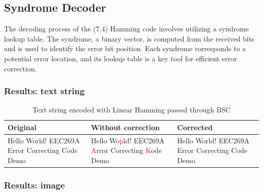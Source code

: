 \documentclass{article}
\begin{document}
\subsection{Syndrome Decoder}
The decoding process of the (7,4) Hamming code involves utilizing a syndrome lookup table. The syndrome, a binary vector, is computed from the received bits and is used to identify the error bit position. Each syndrome corresponds to a potential error location, and its lookup table is a key tool for efficient error correction.





\subsubsection{Results: text string}

\begin{table}[htb]
    \centering
    \caption{Text string encoded with Linear Hamming passed through BSC}
    \label{tab:text-linear-bsc}
    \renewcommand{\arraystretch}{1.5}
    \begin{tabulary}{\textwidth}{ |L|L|L| } 
    \hline
    \textbf{Original} & \textbf{Without correction} & \textbf{Corrected} \\
    \hline
    Hello World! EEC269A Error Correcting Code Demo & Hello Wo\textcolor{red}{p}ld! EEC269A \textcolor{red}{A}rror Correcting \textcolor{red}{K}ode Demo & Hello World! EEC269A Error Correcting Code Demo \\
    \hline
    \end{tabulary}
\end{table}




\subsubsection{Results: image}
\end{document}
